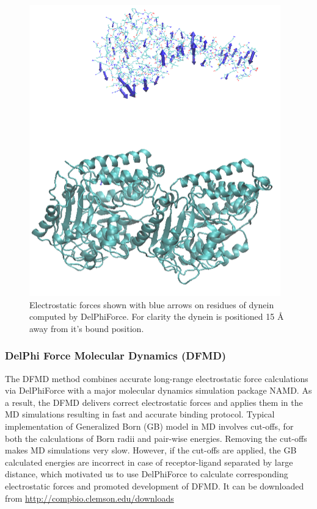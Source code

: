 \documentclass[9pt,tutorial]{livecoms}
\begin{document}
\begin{figure}[hbt!]
\includegraphics[width=\linewidth]{Figure_14.png}
\caption{Electrostatic forces shown with blue arrows on residues of dynein computed by DelPhiForce. For clarity the dynein is positioned 15 $\text{\AA}$ away from it's bound position.}
\label{fig:delphiforce}
\end{figure}

\subsubsection{DelPhi Force Molecular Dynamics (DFMD)}

The DFMD method\cite{peng2019DFMD} combines accurate long-range electrostatic force calculations via DelPhiForce with a major molecular dynamics simulation package NAMD\cite{phillips2005scalable}.  As a result, the DFMD delivers correct electrostatic forces and applies them in the MD simulations resulting in fast and accurate binding protocol. Typical implementation of Generalized Born (GB)\cite{onufriev2000modification} model in MD involves cut-offs, for both the calculations of Born radii and pair-wise energies. Removing the cut-offs makes MD simulations very slow. However, if the cut-offs are applied, the GB calculated energies are incorrect in case of receptor-ligand separated by large distance, which motivated us to use DelPhiForce to calculate corresponding electrostatic forces and promoted development of DFMD. It can be downloaded from \url{http://compbio.clemson.edu/downloads}
\end{document}
